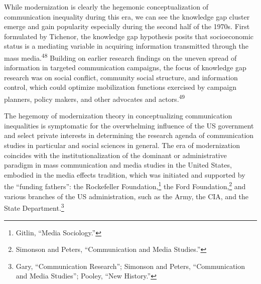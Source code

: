 \documentclass{tufte-handout}
\begin{document}
While modernization is clearly the hegemonic conceptualization of
communication inequality during this era, we can see the knowledge gap
cluster emerge and gain popularity especially during the second half of
the 1970s. First formulated by Tichenor, the knowledge gap hypothesis
posits that socioeconomic status is a mediating variable in acquiring
information transmitted through the mass media.\textsuperscript{48} Building on earlier research findings on
the uneven spread of information in targeted communication campaigns,
the focus of knowledge gap research was on social conflict, community
social structure, and information control, which could optimize
mobilization functions exercised by campaign planners, policy makers,
and other advocates and actors.\textsuperscript{49}
  
\newpage

The hegemony of modernization theory in conceptualizing communication
inequalities is symptomatic for the overwhelming influence of the US
government and select private interests in determining the research
agenda of communication studies in particular and social sciences in
general. The era of modernization coincides with the
institutionalization of the dominant or administrative paradigm in mass
communication and media studies in the United States, embodied in the
media effects tradition, which was initiated and supported by the
``funding fathers'': the Rockefeller Foundation,\footnote{Gitlin,
  ``Media Sociology.''} the Ford Foundation,\footnote{Simonson and
  Peters, ``Communication and Media Studies.''} and various branches of
the US administration, such as the Army, the CIA, and the State
Department.\footnote{Gary, ``Communication Research''; Simonson and
  Peters, ``Communication and Media Studies''; Pooley, ``New History.''}
\end{document}
